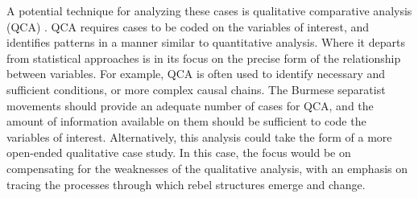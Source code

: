 A potential technique for analyzing these cases is qualitative comparative analysis (QCA) \citep{Ragin2000}. QCA requires cases to be coded on the variables of interest, and identifies patterns in a manner similar to quantitative analysis. Where it departs from statistical approaches is in its focus on the precise form of the relationship between variables. For example, QCA is often used to identify necessary and sufficient conditions, or more complex causal chains. The Burmese separatist movements should provide an adequate number of cases for QCA, and the amount of information available on them should be sufficient to code the variables of interest. Alternatively, this analysis could take the form of a more open-ended qualitative case study. In this case, the focus would be on compensating for the weaknesses of the qualitative analysis, with an emphasis on tracing the processes through which rebel structures emerge and change.
